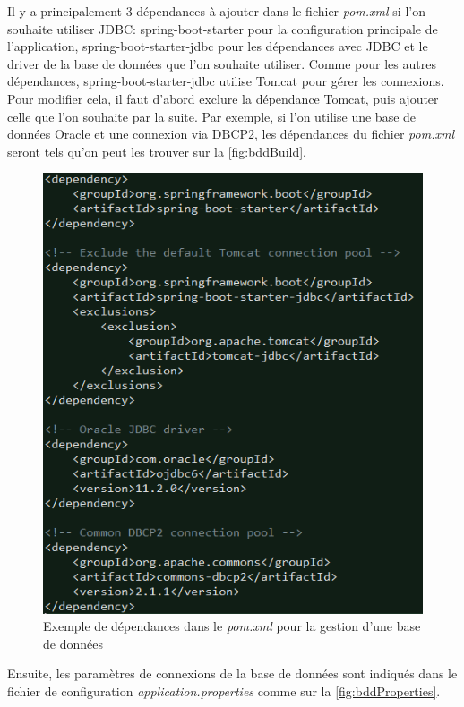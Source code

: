 \documentclass{polytech/polytech}
\begin{document}
Il y a principalement 3 dépendances à ajouter dans le fichier \textit{pom.xml} si l’on souhaite utiliser JDBC: spring-boot-starter pour la configuration principale de l’application, spring-boot-starter-jdbc pour les dépendances avec JDBC et le driver de la base de données que l’on souhaite utiliser. Comme pour les autres dépendances, spring-boot-starter-jdbc utilise Tomcat pour gérer les connexions. Pour modifier cela, il faut d’abord exclure la dépendance Tomcat, puis ajouter celle que l’on souhaite par la suite. Par exemple, si l’on utilise une base de données Oracle et une connexion via DBCP2, les dépendances du fichier \textit{pom.xml} seront tels qu'on peut les trouver sur la \autoref{fig:bddBuild}. 

\begin{figure}
	\includegraphics[scale=0.75]{images/bddPom}
	\caption{Exemple de dépendances dans le \textit{pom.xml} pour la gestion d'une base de données}
	\label{fig:bddBuild}
\end{figure}

Ensuite, les paramètres de connexions de la base de données sont indiqués dans le fichier de configuration \textit{application.properties} comme sur la \autoref{fig:bddProperties}.
\end{document}
